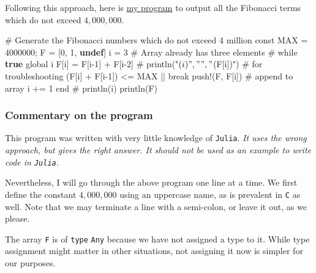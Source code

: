 \documentclass[
  a4paper,
]{article}
\newenvironment{Shaded}{\begin{snugshade}}{\end{snugshade}}
\newcommand{\CommentTok}[1]{\textcolor[rgb]{0.50,0.62,0.50}{#1}}
\newcommand{\ConstantTok}[1]{\textcolor[rgb]{0.86,0.64,0.64}{\textbf{#1}}}
\newcommand{\ControlFlowTok}[1]{\textcolor[rgb]{0.94,0.87,0.69}{#1}}
\newcommand{\FloatTok}[1]{\textcolor[rgb]{0.75,0.75,0.82}{#1}}
\newcommand{\FunctionTok}[1]{\textcolor[rgb]{0.94,0.94,0.56}{#1}}
\newcommand{\KeywordTok}[1]{\textcolor[rgb]{0.94,0.87,0.69}{#1}}
\newcommand{\NormalTok}[1]{\textcolor[rgb]{0.80,0.80,0.80}{#1}}
\newcommand{\OperatorTok}[1]{\textcolor[rgb]{0.94,0.94,0.82}{#1}}
\begin{document}
Following this approach, here is \href{auxiliary/until-4m.jl}{my
program} to output all the Fibonacci terms which do not exceed
\(4,000,000\).

\begin{Shaded}
\begin{Highlighting}[]
\CommentTok{\# Generate the Fibonacci numbers which do not exceed 4 million}
\KeywordTok{const}\NormalTok{ MAX }\OperatorTok{=} \FloatTok{4000000}\NormalTok{;}
\NormalTok{F }\OperatorTok{=}\NormalTok{ [}\FloatTok{0}\NormalTok{, }\FloatTok{1}\NormalTok{, }\ConstantTok{undef}\NormalTok{]}
\NormalTok{i }\OperatorTok{=} \FloatTok{3} \CommentTok{\# Array already has three elements}
\CommentTok{\#}
\ControlFlowTok{while} \ConstantTok{true}
  \KeywordTok{global}\NormalTok{ i}
\NormalTok{  F[i] }\OperatorTok{=}\NormalTok{ F[i}\OperatorTok{{-}}\FloatTok{1}\NormalTok{] }\OperatorTok{+}\NormalTok{ F[i}\OperatorTok{{-}}\FloatTok{2}\NormalTok{]}
  \CommentTok{\# println("$(i)" , " ", "$(F[i])") \# for troubleshooting}
\NormalTok{  (F[i] }\OperatorTok{+}\NormalTok{ F[i}\OperatorTok{{-}}\FloatTok{1}\NormalTok{]) }\OperatorTok{\textless{}=}\NormalTok{ MAX }\OperatorTok{||} \ControlFlowTok{break}
  \FunctionTok{push!}\NormalTok{(F, F[i]) }\CommentTok{\# append to array}
\NormalTok{  i }\OperatorTok{+=} \FloatTok{1}
\ControlFlowTok{end}
\CommentTok{\#}
\FunctionTok{println}\NormalTok{(i)}
\FunctionTok{println}\NormalTok{(F)}
\end{Highlighting}
\end{Shaded}

\hypertarget{commentary-on-the-program}{%
\subsubsection{Commentary on the
program}\label{commentary-on-the-program}}

This program was written with very little knowledge of \texttt{Julia}.
\emph{It uses the wrong approach, but gives the right answer. It should
not be used as an example to write code in \texttt{Julia}.}

Nevertheless, I will go through the above program one line at a time. We
first define the constant \(4,000,000\) using an uppercase name, as is
prevalent in \texttt{C} as well. Note that we may terminate a line with
a semi-colon, or leave it out, as we please.

The array \texttt{F} is of \texttt{type} \texttt{Any} because we have
not assigned a type to it. While type assignment might matter in other
situations, not assigning it now is simpler for our purposes.
\end{document}
